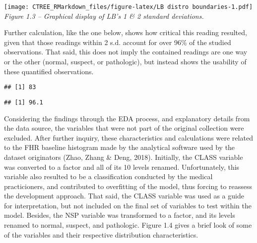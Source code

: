 \documentclass[
]{article}
\begin{document}
\texttt{[image: CTREE\_RMarkdown\_files/figure-latex/LB distro boundaries-1.pdf]}
\emph{Figure 1.3 -- Graphical display of LB's 1 \& 2 standard
deviations.}

Further calculation, like the one below, shows how critical this reading
resulted, given that those readings within 2 s.d. account for over 96\%
of the studied observations. That said, this does not imply the
contained readings are one way or the other (normal, suspect, or
pathologic), but instead shows the usability of these quantified
observations.

\begin{verbatim}
## [1] 83
\end{verbatim}

\begin{verbatim}
## [1] 96.1
\end{verbatim}

Considering the findings through the EDA process, and explanatory
details from the data source, the variables that were not part of the
original collection were excluded. After further inquiry, these
characteristics and calculations were related to the FHR baseline
histogram made by the analytical software used by the dataset
originators (Zhao, Zhang \& Deng, 2018). Initially, the CLASS variable
was converted to a factor and all of its 10 levels renamed.
Unfortunately, this variable also resulted to be a classification
conducted by the medical practicioners, and contributed to overfitting
of the model, thus forcing to reassess the development approach. That
said, the CLASS variable was used as a guide for interpretation, but not
included on the final set of variables to test within the model.
Besides, the NSP variable was transformed to a factor, and its levels
renamed to normal, suspect, and pathologic. Figure 1.4 gives a brief
look of some of the variables and their respective distribution
characteristics.
\end{document}
